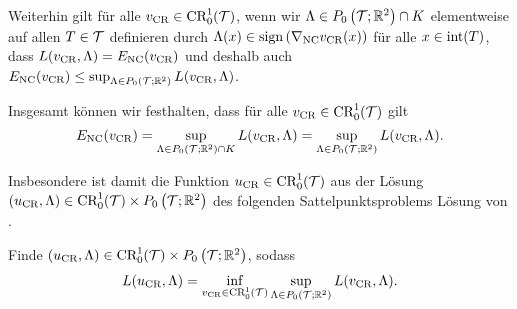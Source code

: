 Weiterhin gilt für alle $v_\textup{CR}\in\textup{CR}^1_0(\mathcal{T})$, wenn wir
$\Lambda\in P_0\left(\mathcal{T};\mathbb{R}^2\right)\cap K$ elementweise auf allen $T\in\mathcal{T}$
definieren durch $\Lambda(x)\in\operatorname{sign}\left(\nabla_\textup{NC}v_\textup{CR}(x)\right)$ für alle
$x\in \operatorname{int}(T)$, dass $L(v_\textup{CR},\Lambda)=E_\textup{NC}(v_\textup{CR})$ und deshalb auch
$E_\textup{NC}(v_\textup{CR})\leq\sup_{\Lambda\in P_0\left(\mathcal{T};\mathbb{R}^2\right)}L(v_\textup{CR},\Lambda)$.

Insgesamt können wir festhalten, dass für alle $v_\textup{CR}\in\textup{CR}^1_0(\mathcal{T})$ gilt
\begin{equation}
  \label{eq:discreteEnergySaddlefunctionalEquality}
  E_\textup{NC}(v_\textup{CR})
  =\sup_{\Lambda\in P_0\left(\mathcal{T};\mathbb{R}^2\right)\cap K}L(v_\textup{CR},\Lambda)
  =\sup_{\Lambda\in P_0\left(\mathcal{T};\mathbb{R}^2\right)}L(v_\textup{CR},\Lambda).
\end{equation}

Insbesondere ist damit die Funktion $u_\textup{CR}\in\textup{CR}^1_0(\mathcal{T})$ 
aus der Lösung $\left( u_\textup{CR},\Lambda \right)\in\textup{CR}^1_0(\mathcal{T})\times
 P_0\left(\mathcal{T};\mathbb{R}^2\right)$ des folgenden Sattelpunktsproblems Lösung von
.
\begin{problem}\label{prob:discreteSaddlepointProblem}
  Finde $\left( u_\textup{CR},\Lambda \right)\in\textup{CR}^1_0(\mathcal{T})\times
  P_0\left(\mathcal{T};\mathbb{R}^2\right)$,
  sodass
  \begin{align*}
    L(u_\textup{CR},\Lambda) 
    = 
    \inf_{v_\textup{CR}\in\textup{CR}^1_0(\mathcal{T})}\sup_{\Lambda\in P_0\left(\mathcal{T};\mathbb{R}^2\right)}
    L(v_\textup{CR},\Lambda).
  \end{align*}
\end{problem}

